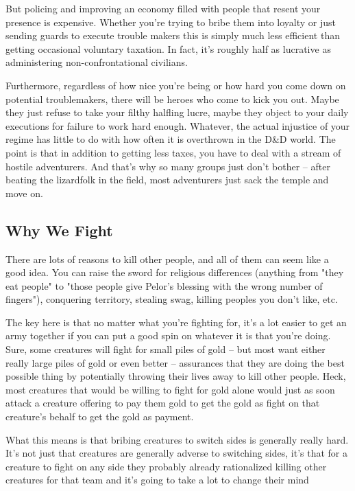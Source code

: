 But policing and improving an economy filled with people that resent your presence is expensive. Whether you're trying to bribe them into loyalty or just sending guards to execute trouble makers this is simply much less efficient than getting occasional voluntary taxation. In fact, it's roughly half as lucrative as administering non-confrontational civilians.

Furthermore, regardless of how nice you're being or how hard you come down on potential troublemakers, there will be heroes who come to kick you out. Maybe they just refuse to take your filthy halfling lucre, maybe they object to your daily executions for failure to work hard enough. Whatever, the actual injustice of your regime has little to do with how often it is overthrown in the D\&D world. The point is that in addition to getting less taxes, you have to deal with a stream of hostile adventurers. And that's why so many groups just don't bother -- after beating the lizardfolk in the field, most adventurers just sack the temple and move on.

\subsection{Why We Fight}
\vspace*{-8pt}

There are lots of reasons to kill other people, and all of them can seem like a good idea. You can raise the sword for religious differences (anything from "they eat people" to "those people give Pelor's blessing with the wrong number of fingers"), conquering territory, stealing swag, killing peoples you don't like, etc.

The key here is that no matter what you're fighting for, it's a lot easier to get an army together if you can put a good spin on whatever it is that you're doing. Sure, some creatures will fight for small piles of gold -- but most want either really large piles of gold or even better -- assurances that they are doing the best possible thing by potentially throwing their lives away to kill other people. Heck, most creatures that would be willing to fight for gold alone would just as soon attack a creature offering to pay them gold to get the gold as fight on that creature's behalf to get the gold as payment.

What this means is that bribing creatures to switch sides is generally really hard. It's not just that creatures are generally adverse to switching sides, it's that for a creature to fight on any side they probably already rationalized killing other creatures for that team and it's going to take a lot to change their mind
